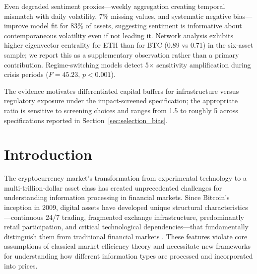 \documentclass[pdflatex,sn-mathphys-num]{sn-jnl}
\theoremstyle{thmstyleone}
\theoremstyle{thmstyletwo}
\theoremstyle{thmstylethree}
\begin{document}
{Even degraded sentiment proxies---weekly aggregation creating temporal mismatch with daily volatility, 7\% missing values, and systematic negative bias---improve model fit for 83\% of assets, suggesting sentiment is informative about contemporaneous volatility even if not leading it. Network analysis exhibits higher eigenvector centrality for ETH than for BTC (0.89 vs 0.71) in the six-asset sample; we report this as a supplementary observation rather than a primary contribution. Regime-switching models detect 5$\times$ sensitivity amplification during crisis periods ($F=45.23$, $p<0.001$).

The evidence motivates differentiated capital buffers for infrastructure versus regulatory exposure under the impact-screened specification; the appropriate ratio is sensitive to screening choices and ranges from 1.5 to roughly 5 across specifications reported in Section~\ref{sec:selection_bias}.
}


\maketitle


\section{Introduction}\label{sec:intro}

The cryptocurrency market's transformation from experimental technology to a multi-trillion-dollar asset class has created unprecedented challenges for understanding information processing in financial markets. Since Bitcoin's inception in 2009, digital assets have developed unique structural characteristics---continuous 24/7 trading, fragmented exchange infrastructure, predominantly retail participation, and critical technological dependencies---that fundamentally distinguish them from traditional financial markets \citep{MakarovSchoar2020, Urquhart2016}. These features violate core assumptions of classical market efficiency theory \citep{Fama1970} and necessitate new frameworks for understanding how different information types are processed and incorporated into prices.
\end{document}
